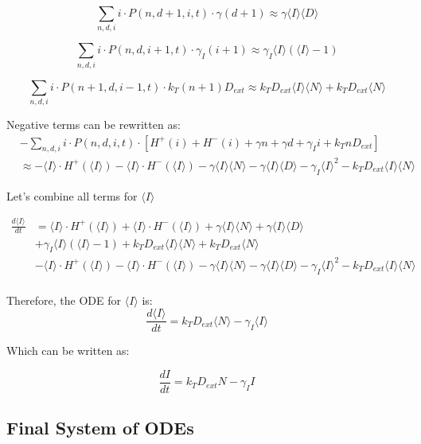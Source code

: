 \documentclass{article}
\begin{document}
\begin{flushleft}
\[
\sum_{n,d,i} i \cdot P(n,d+1,i,t) \cdot \gamma(d+1) \approx \gamma \langle I \rangle \langle D \rangle
\]

\[
\sum_{n,d,i} i \cdot P(n,d,i+1,t) \cdot \gamma_I(i+1) \approx \gamma_I \langle I \rangle (\langle I \rangle - 1)
\]

\[
\sum_{n,d,i} i \cdot P(n+1,d,i-1,t) \cdot k_T(n+1)D_{ext} \approx k_T D_{ext} \langle I \rangle \langle N \rangle + k_T D_{ext} \langle N \rangle
\]

Negative terms can be rewritten as:
\begin{align*}
&-\sum_{n,d,i} i \cdot P(n,d,i,t) \cdot [H^+(i) + H^-(i) + \gamma n + \gamma d + \gamma_I i + k_T n D_{ext}] \\
&\approx -\langle I \rangle \cdot H^+(\langle I \rangle) - \langle I \rangle \cdot H^-(\langle I \rangle) - \gamma \langle I \rangle \langle N \rangle - \gamma \langle I \rangle \langle D \rangle - \gamma_I \langle I \rangle^2 - k_T D_{ext} \langle I \rangle \langle N \rangle
\end{align*}

Let's combine all terms for $\langle I \rangle$

\begin{align*}
\frac{d\langle I \rangle}{dt} &= \langle I \rangle \cdot H^+(\langle I \rangle) + \langle I \rangle \cdot H^-(\langle I \rangle) + \gamma \langle I \rangle \langle N \rangle + \gamma \langle I \rangle \langle D \rangle \\
&+ \gamma_I \langle I \rangle (\langle I \rangle - 1) + k_T D_{ext} \langle I \rangle \langle N \rangle + k_T D_{ext} \langle N \rangle \\
&- \langle I \rangle \cdot H^+(\langle I \rangle) - \langle I \rangle \cdot H^-(\langle I \rangle) - \gamma \langle I \rangle \langle N \rangle - \gamma \langle I \rangle \langle D \rangle - \gamma_I \langle I \rangle^2 - k_T D_{ext} \langle I \rangle \langle N \rangle \\
\end{align*}

Therefore, the ODE for $\langle I \rangle$ is:
\[
\frac{d\langle I \rangle}{dt} = k_T D_{ext} \langle N \rangle - \gamma_I \langle I \rangle
\]

Which can be written as:

\[
\frac{dI}{dt} = k_T D_{ext} N - \gamma_I I
\]

\subsection*{Final System of ODEs}


\end{flushleft}
\end{document}
